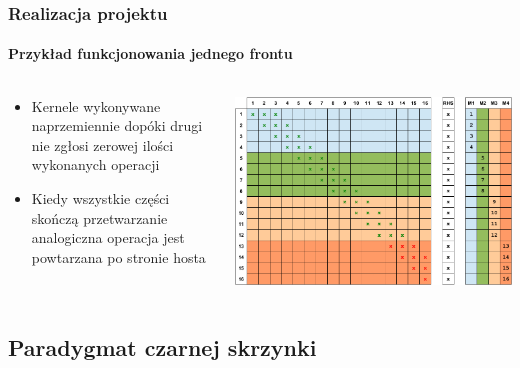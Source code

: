 \documentclass{beamer}
\begin{document}
\begin{frame}
\frametitle{Realizacja projektu}
\framesubtitle{Przykład funkcjonowania jednego frontu}
\begin{columns}[t] %
     \begin{column}[T]{5cm} %
     \begin{itemize}
		\item Kernele wykonywane naprzemiennie dopóki drugi nie zgłosi zerowej ilości wykonanych operacji
		\item Kiedy wszystkie części skończą przetwarzanie analogiczna operacja jest powtarzana po stronie hosta
     \end{itemize}
     \end{column}
     \begin{column}[T]{7cm} %
		\includegraphics[scale=0.3]{frame9.jpg}
     \end{column}
     \end{columns}
\end{frame}

\subsection{Paradygmat czarnej skrzynki}
\end{document}
